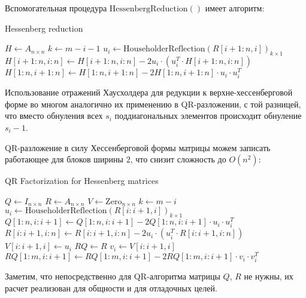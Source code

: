 \documentclass[a4paper,14pt]{extarticle}
\begin{document}
\noindent Вспомогательная процедура $\mathrm{HessenbergReduction}()$ имеет алгоритм:

\vspace{8pt}
\begin{algorithm}[H]
\caption{Hessenberg reduction}
\vspace{4pt}
$H \gets A_{n \times n}$\;
 {
	$k \gets m - i - 1$\;
	$u_i \gets \mathrm{HouseholderReflection}(R[i+1:n, i])_{k \times 1}$\;
	$H[i+1:n, i:n] \gets H[i+1:n, i:n] - 2 u_i \cdot (u_i^T \cdot H[i+1:n, i:n])$\;
	$H[1:n, i+1:n] \gets H[1:n, i+1:n] - 2 H[1:n, i+1:n] \cdot u_i \cdot u_i^T$\;
}
\end{algorithm}
\vspace{8pt}

\noindent Использование отражений Хаусхолдера для редукции к верхне-хессенберговой форме во многом аналогично их применению в QR-разложении, с той разницей, что вместо обнуления всех $s_i$ поддиагональных элементов происходит обнуление $s_i - 1$.

QR-разложение в силу Хессенберговой формы матрицы можем записать работающее для блоков ширины $2$, что снизит сложность до $O(n^2)$:

\vspace{8pt}
\begin{algorithm}[H]
\caption{QR Factorization for Hessenberg matrices}
\vspace{4pt}
$Q \gets I_{n \times n}$\;
$R \gets A_{n \times n}$\;
$V \gets \mathrm{Zero}_{n \times n}$\;
 {
	$k \gets m - i$\;
	$u_i \gets \mathrm{HouseholderReflection}(R[i:i+1, i])_{k \times 1}$\;
	$Q[1:n, i:i+1] \gets Q[1:n, i:i+1] - 2 Q[1:n, i:i+1] \cdot u_i \cdot u_i^T$\;
	$R[i:i+1, i:n] \gets R[i:i+1, i:n] - 2 u_i \cdot (u_i^T \cdot R[i:i+1, i:n])$\;
	$V[i:i+1, i] \gets u_i$\; 
}
$RQ \gets R$\;
 {
	$v_i \gets V[i:i+1, i]$\;
	$RQ[1:m, i:i+1] \gets RQ[1:m, i:i+1] - 2 RQ[1:m, i:i+1] \cdot v_i \cdot v_i^T$\;
}
\end{algorithm}
\vspace{8pt}

\noindent Заметим, что непосредственно для QR-алгоритма матрицы $Q$, $R$ не нужны, их расчет реализован для общности и для отладочных целей.
\end{document}
